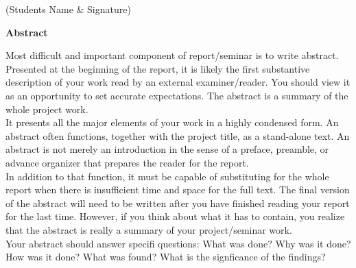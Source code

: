 \documentclass[11pt,a4paper]{article}
\begin{document}
\vspace{0.5 in}

(Students Name \& Signature) 
\newpage

\begin{center}\textbf{\large {Abstract}}
\end{center}

Most difficult and important component of report/seminar is to write abstract. Presented at the beginning of the report, it is likely the first substantive description of your work read by an external examiner/reader. You should view it as an opportunity to set accurate expectations. The abstract is a summary of the whole project work.\\ 

It presents all the major elements of your work in a highly condensed form. An abstract often functions, together with the project title, as a stand-alone text. An abstract is not merely an introduction in the sense of a preface, preamble, or advance organizer that prepares the reader for the report.\\

In addition to that function, it must be capable of substituting for the whole report when there is insufficient time and space for the full text. The final version of the abstract will need to be written after you have finished reading your report for the last time. However, if you think about what it has to contain, you realize that the abstract is really a summary of your project/seminar work.\\

Your abstract should answer specifi questions: What was done? Why was it done? How was it done? What was found? What is the signficance of the findings?

\newpage
\end{document}
